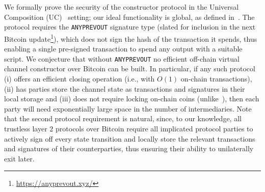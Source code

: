   We formally prove the security of the constructor protocol in the Universal
  Composition (UC)~\cite{uc} setting; our ideal functionality is global,
  as defined in~\cite{DBLP:conf/tcc/BadertscherCHTZ20}. The
  protocol requires the \texttt{ANYPREVOUT} signature type (slated for
  inclusion in the next Bitcoin update\footnote{\url{https://anyprevout.xyz/}}), which does not sign the hash of the
  transaction it spends, thus enabling a single pre-signed transaction
  to spend any output with a suitable script. We conjecture that without
  \texttt{ANYPREVOUT} no efficient off-chain virtual channel constructor
  over Bitcoin can be built. In particular, if any such protocol
  (i) offers an efficient closing operation (i.e., with $O(1)$ on-chain
  transactions), (ii) has parties store the channel state as transactions and
  signatures in their local storage and (iii) does not require locking on-chain
  coins (unlike~\cite{donner}), then each party will need exponentially
  large space in the number of intermediaries. Note that the second protocol
  requirement is natural, since, to our knowledge, all trustless layer $2$
  protocols over Bitcoin require all implicated protocol parties to actively
  sign off every state transition and locally store the relevant transactions
  and signatures of their counterparties, thus ensuring their ability to
  unilaterally exit later.
